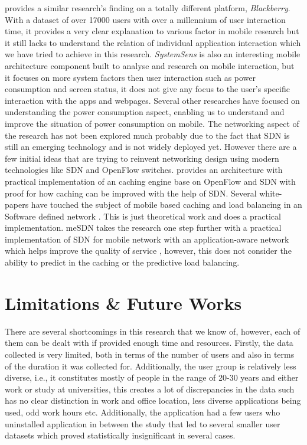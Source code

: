 \documentclass[prodmode,acmtecs]{acmsmall}
\begin{document}
\cite{oliver2010challenges} provides a similar research's finding on a totally different platform, \textit{Blackberry}. With a dataset of over 17000 users with over a millennium of user interaction time, it provides a very clear explanation to various factor in mobile research but it still lacks to understand the relation of individual application interaction which we have tried to achieve in this research. \textit{SystemSens} \cite{falaki2011systemsens} is also an interesting mobile architecture component built to analyse and research on mobile interaction, but it focuses on more system factors then user interaction such as power consumption and screen status, it does not give any focus to the user's specific interaction with the apps and webpages. Several other researches \cite{ferreira2011understanding,alawnah2013modeling} have focused on understanding the power consumption aspect, enabling us to understand and improve the situation of power consumption on mobile.
The networking aspect of the research has not been explored much probably due to the fact that SDN is still an emerging technology and is not widely deployed yet. However there are a few initial ideas that are trying to reinvent networking design using modern technologies like SDN and OpenFlow switches. \cite{chanda2013content} provides an architecture with practical implementation of an caching engine base on OpenFlow and SDN with proof for how caching can be improved with the help of SDN. Several white-papers have touched the subject of mobile based caching and load balancing in an Software defined network \cite{openflow2013,2013aricent}. This is just theoretical work and does a practical implementation. meSDN takes the research one step further with a practical implementation of SDN for mobile network with an application-aware network which helps improve the quality of service \cite{lee2014mesdn}, however, this does not consider the ability to predict in the caching or the predictive load balancing.


\section{Limitations \& Future Works}
There are several shortcomings in this research that we know of, however, each of them can be dealt with if provided enough time and resources. Firstly, the data collected is very limited, both in terms of the number of users and also in terms of the duration it was collected for. Additionally, the user group is relatively less diverse, i.e., it constitutes mostly of people in the range of 20-30 years and either work or study at universities, this creates a lot of discrepancies in the data such has no clear distinction in work and office location, less diverse applications being used, odd work hours etc. Additionally, the application had a few users who uninstalled application in between the study that led to several smaller user datasets which proved statistically insignificant in several cases.
\end{document}
